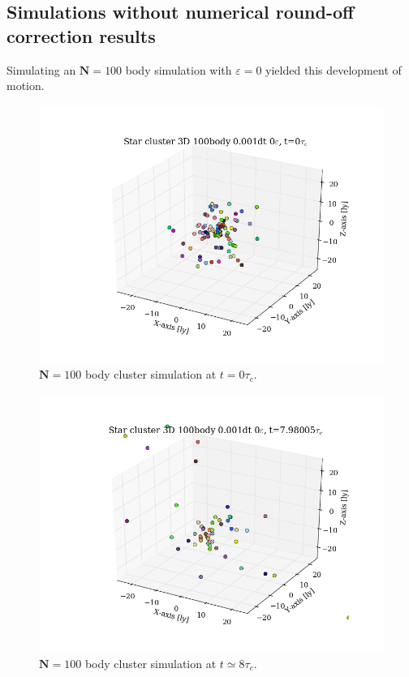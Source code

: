 \documentclass[11pt,a4paper,notitlepage,twocolumn]{article}
\begin{document}
\subsection{Simulations without numerical round-off correction results}
Simulating an $\mathbf{N} = 100$ body simulation with $\varepsilon = 0$ yielded this development of motion.
\begin{figure}
[H]\center
\includegraphics[scale=0.35]{../moviefigs/ClusterPos_100body_dt1_eps0_dur16_movie0.png}
\caption{$\mathbf{N} = 100$ body cluster simulation at $t = 0\tau_c$.}
\end{figure}
\begin{figure}
[H]\center
\includegraphics[scale=0.35]{../moviefigs/ClusterPos_100body_dt1_eps0_dur16_movie200.png}
\caption{$\mathbf{N} = 100$ body cluster simulation at $t \simeq 8\tau_c$.}
\end{figure}
\end{document}
